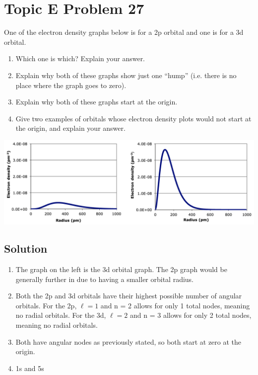 \documentclass[10pt]{article}
\begin{document}
    \section{Topic E Problem 27}
        One of the electron density graphs below is for a 2p orbital and one is for a 3d orbital.
        \begin{enumerate}[label=\alph*)]
            \item   Which one is which? Explain your answer.
            \item   Explain why both of these graphs show just one “hump” (i.e. there is no place where the graph goes to zero).
            \item   Explain why both of these graphs start at the origin.
            \item   Give two examples of orbitals whose electron density plots would not start at the origin, and explain your answer.
        \end{enumerate}
        \begin{center}
            \includegraphics[width=\textwidth]{img-E27.png}
        \end{center}

        \subsection{Solution}
            \begin{enumerate}[label=\alph*/]
                \item   The graph on the left is the 3d orbital graph. The 2p graph would be generally further in due to having a smaller orbital radius.
                \item   Both the 2p and 3d orbitals have their highest possible number of angular orbitals. 
                    For the 2p, $\ell = 1$ and n = 2 allows for only 1 total nodes, meaning no radial orbitals.
                    For the 3d, $\ell = 2$ and n = 3 allows for only 2 total nodes, meaning no radial orbitals.
                \item   Both have angular nodes as previously stated, so both start at zero at the origin.
                \item   1s and 5s
            \end{enumerate}
\end{document}
